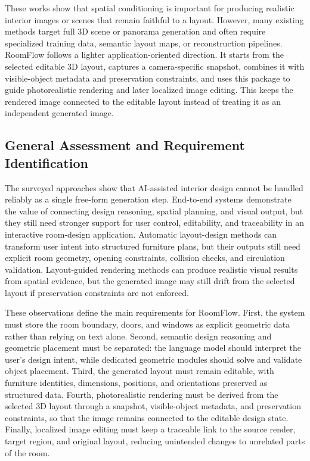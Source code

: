 These works show that spatial conditioning is important for producing realistic interior images or scenes that remain faithful to a layout. However, many existing methods target full 3D scene or panorama generation and often require specialized training data, semantic layout maps, or reconstruction pipelines. RoomFlow follows a lighter application-oriented direction. It starts from the selected editable 3D layout, captures a camera-specific snapshot, combines it with visible-object metadata and preservation constraints, and uses this package to guide photorealistic rendering and later localized image editing. This keeps the rendered image connected to the editable layout instead of treating it as an independent generated image.

\subsection{General Assessment and Requirement Identification}\label{subsec:general-assessment-and-requirement-identification}

The surveyed approaches show that AI-assisted interior design cannot be handled reliably as a single free-form generation step. End-to-end systems demonstrate the value of connecting design reasoning, spatial planning, and visual output, but they still need stronger support for user control, editability, and traceability in an interactive room-design application. Automatic layout-design methods can transform user intent into structured furniture plans, but their outputs still need explicit room geometry, opening constraints, collision checks, and circulation validation. Layout-guided rendering methods can produce realistic visual results from spatial evidence, but the generated image may still drift from the selected layout if preservation constraints are not enforced.

These observations define the main requirements for RoomFlow. First, the system must store the room boundary, doors, and windows as explicit geometric data rather than relying on text alone. Second, semantic design reasoning and geometric placement must be separated: the language model should interpret the user's design intent, while dedicated geometric modules should solve and validate object placement. Third, the generated layout must remain editable, with furniture identities, dimensions, positions, and orientations preserved as structured data. Fourth, photorealistic rendering must be derived from the selected 3D layout through a snapshot, visible-object metadata, and preservation constraints, so that the image remains connected to the editable design state. Finally, localized image editing must keep a traceable link to the source render, target region, and original layout, reducing unintended changes to unrelated parts of the room.

